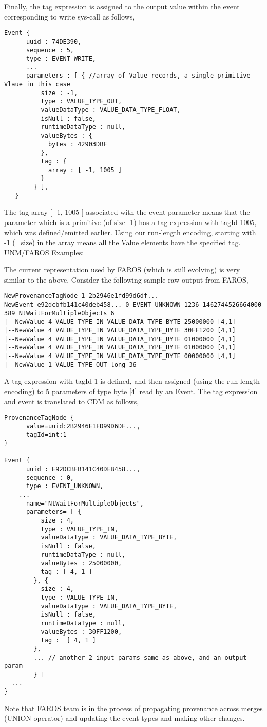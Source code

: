 Finally, the tag expression is assigned to the output value within the event corresponding to write sys-call as follows,
\begin{Verbatim}[fontsize=\small]
  Event {
      uuid : 74DE390,
      sequence : 5,
      type : EVENT_WRITE,
      ...
      parameters : [ { //array of Value records, a single primitive Vlaue in this case
          size : -1,
          type : VALUE_TYPE_OUT,
          valueDataType : VALUE_DATA_TYPE_FLOAT,
          isNull : false,
          runtimeDataType : null,
          valueBytes : {
            bytes : 42903DBF
          },
          tag : {
            array : [ -1, 1005 ]
          }
        } ],
   }
\end{Verbatim}
The tag array [ -1, 1005 ] associated with the event parameter means that the parameter which is a primitive (of size -1) has a tag expression with tagId 1005, which was defined/emitted earlier. Using our run-length encoding, starting with -1 (=size) in the array means all the Value elements have the specified tag.\\


\noindent \underline{UNM/FAROS Examples:}

The current representation used by FAROS (which is still evolving) is very similar to the above. Consider the following sample raw output from FAROS,
\begin{Verbatim}[fontsize=\small]
NewProvenanceTagNode 1 2b2946e1fd99d6df...
NewEvent e92dcbfb141c40deb458... 0 EVENT_UNKNOWN 1236 1462744526664000 389 NtWaitForMultipleObjects 6
|--NewValue 4 VALUE_TYPE_IN VALUE_DATA_TYPE_BYTE 25000000 [4,1] 
|--NewValue 4 VALUE_TYPE_IN VALUE_DATA_TYPE_BYTE 30FF1200 [4,1] 
|--NewValue 4 VALUE_TYPE_IN VALUE_DATA_TYPE_BYTE 01000000 [4,1] 
|--NewValue 4 VALUE_TYPE_IN VALUE_DATA_TYPE_BYTE 01000000 [4,1] 
|--NewValue 4 VALUE_TYPE_IN VALUE_DATA_TYPE_BYTE 00000000 [4,1] 
|--NewValue 1 VALUE_TYPE_OUT long 36
\end{Verbatim}
A tag expression with tagId 1 is defined, and then assigned (using the run-length encoding) to 5 parameters of type byte [4] read by an Event. 
The tag expression and event is translated to CDM as follows,
\begin{Verbatim}[fontsize=\small]
ProvenanceTagNode {
      value=uuid:2B2946E1FD99D6DF...,
      tagId=int:1
}

Event {
      uuid : E92DCBFB141C40DEB458...,
      sequence : 0,
      type : EVENT_UNKNOWN,
	...
      name="NtWaitForMultipleObjects",
      parameters= [ {
          size : 4,
          type : VALUE_TYPE_IN,
          valueDataType : VALUE_DATA_TYPE_BYTE,
          isNull : false,
          runtimeDataType : null,
          valueBytes : 25000000,
          tag : [ 4, 1 ]
        }, {
          size : 4,
          type : VALUE_TYPE_IN,
          valueDataType : VALUE_DATA_TYPE_BYTE,
          isNull : false,
          runtimeDataType : null,
          valueBytes : 30FF1200,
          tag :  [ 4, 1 ]
        }, 
        ... // another 2 input params same as above, and an output param
        } ]
  ...
}
\end{Verbatim}
Note that FAROS team is in the process of propagating provenance across merges (UNION operator) and updating the event types and making other changes.

